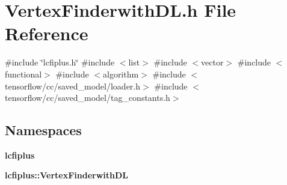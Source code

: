 \section{Vertex\+Finderwith\+D\+L.\+h File Reference}
\label{VertexFinderwithDL_8h}
{\ttfamily \#include \char`\"{}lcfiplus.\+h\char`\"{}}\newline
{\ttfamily \#include $<$list$>$}\newline
{\ttfamily \#include $<$vector$>$}\newline
{\ttfamily \#include $<$functional$>$}\newline
{\ttfamily \#include $<$algorithm$>$}\newline
{\ttfamily \#include $<$tensorflow/cc/saved\+\_\+model/loader.\+h$>$}\newline
{\ttfamily \#include $<$tensorflow/cc/saved\+\_\+model/tag\+\_\+constants.\+h$>$}\newline
\subsection*{Namespaces}
\begin{DoxyCompactItemize}
\item 
 \textbf{ lcfiplus}
\item 
 \textbf{ lcfiplus\+::\+Vertex\+Finderwith\+DL}
\end{DoxyCompactItemize}
